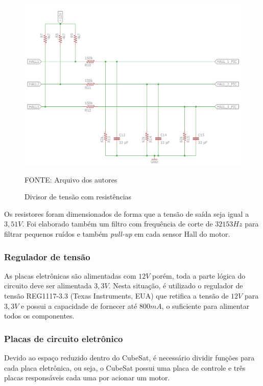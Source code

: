 \documentclass[
	12pt,				%
	openany,			%
	twoside,			%
	a4paper,			%
	english,			%
	french,				%
	spanish,			%
	brazil,				%
	oldfontcommands
	]{abntex2}
\begin{document}
\begin{figure}[th]
	\caption{Divisor de tensão com resistências}
	\centering
	\includegraphics[width=0.75\linewidth]{./figs/Halls_motores}
	
	\begin{small}
		FONTE: Arquivo dos autores
	\end{small}
	\label{fig:Divisor_tensao}
\end{figure}

\newpage

Os resistores foram dimensionados de forma que a tensão de saída seja igual a $3,51V$. Foi elaborado também um filtro com frequência de corte de $32153Hz$ para filtrar pequenos ruídos e também \textit{pull-up} em cada sensor Hall do motor.

\subsubsection{Regulador de tensão}

As placas eletrônicas são alimentadas com $12V$ porém, toda a parte lógica do circuito deve ser alimentada $3,3V$. Nesta situação, é utilizado o regulador de tensão REG1117-3.3 (Texas Instruments, EUA) que retifica a tensão de $12V$ para $3,3V$ e possui a capacidade de fornecer até $800mA$, o suficiente para alimentar todos os componentes.

\subsubsection{Placas de circuito eletrônico}

Devido ao espaço reduzido dentro do CubeSat, é necessário dividir funções para cada placa eletrônica, ou seja, o CubeSat possui uma placa de controle e três placas responsáveis cada uma por acionar um motor.
\end{document}
